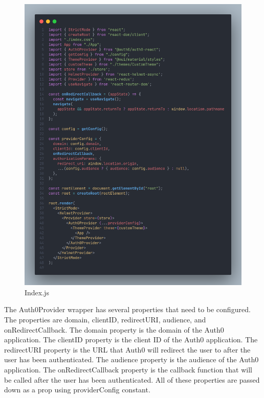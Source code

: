 \begin{justify}
        \begin{figure}[H]
            \centerline{\includegraphics[width=150mm,scale=1]{figures/implementation_and_testing/implementation/frontend/index.png}}
            \caption{Index.js}
        \end{figure}
        
        \vspace{0.25cm}
        \newendline The Auth0Provider wrapper has several properties that need to be configured. The properties are domain, clientID, redirectURI, audience, and onRedirectCallback. The domain property is the domain of the Auth0 application. The clientID property is the client ID of the Auth0 application. The redirectURI property is the URL that Auth0 will redirect the user to after the user has been authenticated. The audience property is the audience of the Auth0 application. The onRedirectCallback property is the callback function that will be called after the user has been authenticated. All of these properties are passed down as a prop using providerConfig constant.
        

\end{justify}

